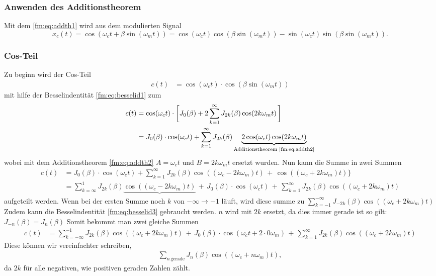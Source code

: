 \subsubsection{Anwenden des Additionstheorem}
Mit dem \eqref{fm:eq:addth1} wird aus dem modulierten Signal
\[
    x_c(t) 
    =
    \cos(\omega_c t + \beta\sin(\omega_mt))
    =
    \cos(\omega_c t)\cos(\beta\sin(\omega_m t)) - \sin(\omega_ct)\sin(\beta\sin(\omega_m t)).
    \label{fm:eq:start}
\]
\subsubsection{Cos-Teil}
Zu beginn wird der Cos-Teil
\begin{align*}
    c(t) 
    &=
    \cos(\omega_c t)\cdot\cos(\beta\sin(\omega_mt))  
\end{align*}
mit hilfe der Besselindentität \eqref{fm:eq:besselid1} zum
\begin{align*}
    c(t)
    &=
    \cos(\omega_c t) \cdot \bigg[ J_0(\beta) + 2\sum_{k=1}^\infty J_{2k}(\beta) \cos( 2k \omega_m t)\, \bigg]
    \\
    &=
    J_0(\beta) \cdot \cos(\omega_c t) + \sum_{k=1}^\infty J_{2k}(\beta) \underbrace{2\cos(\omega_c t)\cos(2k\omega_m t)}_{\text{Additionstheorem \eqref{fm:eq:addth2}}}
\end{align*}
wobei mit dem Additionstheorem \eqref{fm:eq:addth2} \(A = \omega_c t\) und \(B = 2k\omega_m t \) ersetzt wurden.
Nun kann die Summe in zwei Summen 
\begin{align*}
    c(t)
    &=
    J_0(\beta) \cdot \cos(\omega_c t) + \sum_{k=1}^\infty J_{2k}(\beta) \cos((\omega_c - 2k \omega_m) t) \,+\, \cos((\omega_c + 2k \omega_m) t) \}
    \\
    &=
    \sum_{k=\infty}^{1} J_{2k}(\beta)  \underbrace{\cos((\omega_c - 2k \omega_m) t)} 
    \,+\,J_0(\beta)\cdot \cos(\omega_c t) 
    \,+\, \sum_{k=1}^\infty J_{2k}(\beta)\cos((\omega_c + 2k \omega_m) t) 
\end{align*}
aufgeteilt werden.
Wenn bei der ersten Summe noch \(k\) von \(-\infty \to -1\) läuft, wird diese summe zu \(\sum_{k=-1}^{-\infty} J_{-2k}(\beta)  {\cos((\omega_c + 2k \omega_m) t)} \)
Zudem kann die Besselindentität \eqref{fm:eq:besselid3} gebraucht werden.  \(n \) wird  mit \(2k\) ersetzt, da dies immer gerade ist so gilt: \(J_{-n}(\beta) = J_n(\beta)\)
Somit bekommt man zwei gleiche Summen
\begin{align*}
    c(t)
    &=
    \sum_{k=-\infty}^{-1} J_{2k}(\beta) \cos((\omega_c + 2k \omega_m) t)
    \,+\,J_0(\beta)\cdot \cos(\omega_c t+ 2 \cdot 0 \omega_m) 
    \,+\, \sum_{k=1}^\infty J_{2k}(\beta)\cos((\omega_c + 2k \omega_m) t) 
\end{align*}
Diese können wir vereinfachter schreiben,
\begin{align*}
    \sum_{n\, \text{gerade}} J_{n}(\beta) \cos((\omega_c + n \omega_m) t),
    \label{fm:eq:gerade}
\end{align*}
da \(2k\) für alle negativen, wie positiven geraden Zahlen zählt.
